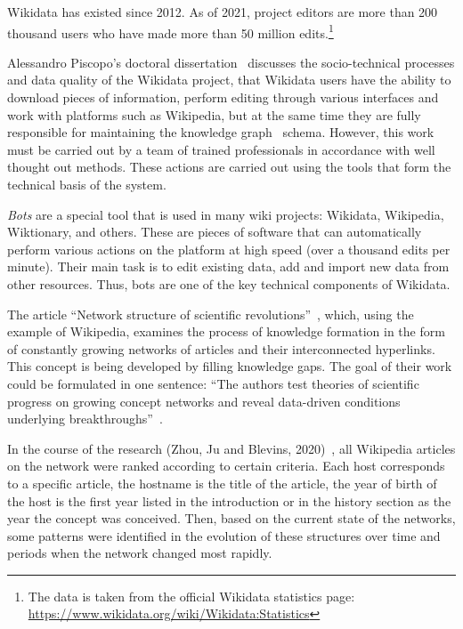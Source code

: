 Wikidata has existed since 2012. As of 2021, project editors are more than 200 thousand users who have made more than 50 million edits.\footnote{The data is taken from the official Wikidata statistics page: \href{https://www.wikidata.org/wiki/Wikidata:Statistics}{https://www.wikidata.org/wiki/Wikidata:Statistics}}

Alessandro Piscopo's doctoral dissertation~ discusses the socio-technical processes and data quality of the Wikidata project, that Wikidata users have the ability to download pieces of information, perform editing through various interfaces and work with platforms such as Wikipedia, but at the same time they are fully responsible for maintaining the knowledge graph~ schema. However, this work must be carried out by a team of trained professionals in accordance with well thought out methods. These actions are carried out using the tools that form the technical basis of the system.

\textit{Bots} 
are a special tool that is used in many wiki projects: Wikidata, Wikipedia, Wiktionary, and others. 
These are pieces of software that can automatically perform various actions on the platform at high speed 
(over a thousand edits per minute). 
Their main task is to edit existing data, 
add and import new data from other resources. 
Thus, bots are one of the key technical components of Wikidata. 

The article ``Network structure of scientific revolutions''~, which, using the example of Wikipedia, examines the process of knowledge formation in the form of constantly growing networks of articles and their interconnected hyperlinks. This concept is being developed by filling knowledge gaps. The goal of their work could be formulated in one sentence: ``The authors test theories of scientific progress on growing concept networks and reveal data-driven conditions underlying breakthroughs''~.

In the course of the research (Zhou, Ju and Blevins, 2020)~, all Wikipedia articles on the network were ranked according to certain criteria. Each host corresponds to a specific article, the hostname is the title of the article, the year of birth of the host is the first year listed in the introduction or in the history section as the year the concept was conceived. Then, based on the current state of the networks, some patterns were identified in the evolution of these structures over time and periods when the network changed most rapidly.

